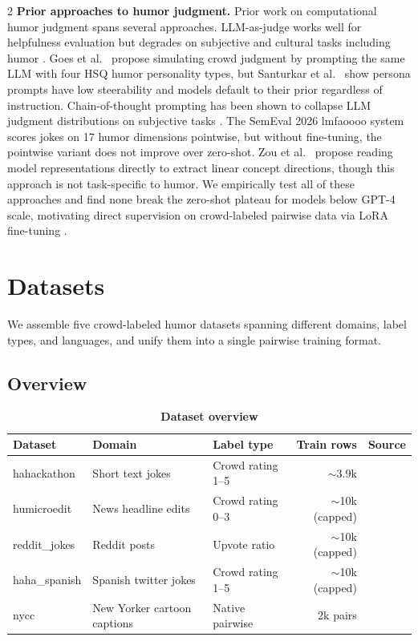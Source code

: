 \documentclass[10pt, a4paper]{article}
\begin{document}
\begin{multicols}{2}
\textbf{Prior approaches to humor judgment.} Prior work on computational humor judgment spans several approaches. LLM-as-judge \cite{zheng2023} works well for helpfulness evaluation but degrades on subjective and cultural tasks including humor \cite{verga2024}. Goes et al.\ \cite{goes2022} propose simulating crowd judgment by prompting the same LLM with four HSQ humor personality types, but Santurkar et al.\ \cite{santurkar2023} show persona prompts have low steerability and models default to their prior regardless of instruction. Chain-of-thought prompting has been shown to collapse LLM judgment distributions on subjective tasks \cite{wang2025}. The SemEval 2026 lmfaoooo system scores jokes on 17 humor dimensions pointwise, but without fine-tuning, the pointwise variant does not improve over zero-shot. Zou et al.\ \cite{zou2023} propose reading model representations directly to extract linear concept directions, though this approach is not task-specific to humor. We empirically test all of these approaches and find none break the zero-shot plateau for models below GPT-4 scale, motivating direct supervision on crowd-labeled pairwise data via LoRA fine-tuning \cite{hu2021,ouyang2022}.

\section{Datasets}

We assemble five crowd-labeled humor datasets spanning different domains, label types, and languages, and unify them into a single pairwise training format.

\subsection{Overview}

\end{multicols}

\begin{table}[H]
\centering
\caption*{\small\textbf{Dataset overview}}
\small
\begin{tabularx}{\textwidth}{llXrr}
\toprule
\textbf{Dataset} & \textbf{Domain} & \textbf{Label type} & \textbf{Train rows} & \textbf{Source} \\
\midrule
hahackathon   & Short text jokes          & Crowd rating 1--5   & $\sim$3.9k          & \cite{meaney2021}   \\
humicroedit   & News headline edits       & Crowd rating 0--3   & $\sim$10k (capped)  & \cite{hossain2020}  \\
reddit\_jokes & Reddit posts              & Upvote ratio        & $\sim$10k (capped)  & \cite{weller2019}   \\
haha\_spanish & Spanish twitter jokes     & Crowd rating 1--5   & $\sim$10k (capped)  & \cite{chiruzzo2019} \\
nycc          & New Yorker cartoon captions & Native pairwise   & 2k pairs            & \cite{hessel2023}   \\
\bottomrule
\end{tabularx}
\end{table}
\end{document}
